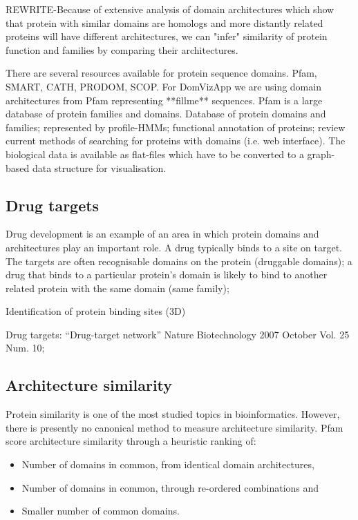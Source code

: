 REWRITE-Because of extensive analysis of domain architectures \cite{The geometry of domain combination in proteins, Bashton M, Chothia, C} which show that protein with similar domains are homologs and more distantly related proteins will have different architectures, we can "infer" similarity of protein function and families by comparing their architectures.

There are several resources available for protein sequence domains. Pfam, SMART, CATH, PRODOM, SCOP. For DomVizApp we are using domain architectures from Pfam representing **fillme** sequences. Pfam is a large database of protein families and domains. Database of protein domains and families; represented by profile-HMMs; functional annotation of proteins; review current methods of searching for proteins with domains (i.e. web interface). The biological data is available as flat-files which have to be converted to a graph-based data structure for visualisation.

\subsection{Drug targets} Drug development is an example of an area in which protein domains and architectures play an important role. A drug typically binds to a site on target. The targets are often recognisable domains on the protein (druggable domains); a drug that binds to a particular protein's domain is likely to bind to another related protein with the same domain (same family);

Identification of protein binding sites (3D)

Drug targets: ``Drug-target network'' Nature Biotechnology 2007 October Vol. 25 Num. 10; 

\subsection{Architecture similarity}
Protein similarity is one of the most studied topics in bioinformatics. However, there is presently no canonical method to measure architecture similarity. Pfam score architecture similarity through a heuristic ranking \cite{pfam2002} of:
\begin{itemize}
	\item Number of domains in common, from identical domain architectures,
	\item Number of domains in common, through re-ordered combinations and
	\item Smaller number of common domains.
\end{itemize}

